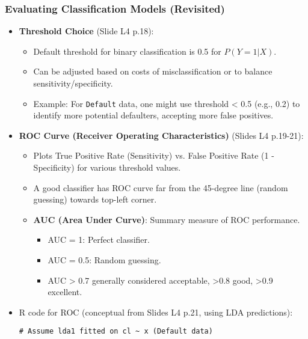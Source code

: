 \documentclass[12pt,a4paper]{article}
\newcommand{\Robject}[1]{\texttt{#1}} %
\begin{document}
\begin{itemize}
    \subsubsection{Evaluating Classification Models (Revisited)}
        \begin{itemize}
            \item \textbf{Threshold Choice} (Slide L4 p.18):
                \begin{itemize}
                    \item Default threshold for binary classification is 0.5 for $P(Y=1|X)$.
                    \item Can be adjusted based on costs of misclassification or to balance sensitivity/specificity.
                    \item Example: For \Robject{Default} data, one might use threshold < 0.5 (e.g., 0.2) to identify more potential defaulters, accepting more false positives.
                \end{itemize}
            \item \textbf{ROC Curve (Receiver Operating Characteristics)} (Slides L4 p.19-21):
                \begin{itemize}
                    \item Plots True Positive Rate (Sensitivity) vs. False Positive Rate (1 - Specificity) for various threshold values.
                    \item A good classifier has ROC curve far from the 45-degree line (random guessing) towards top-left corner.
                    \item \textbf{AUC (Area Under Curve)}: Summary measure of ROC performance.
                        \begin{itemize}
                            \item AUC = 1: Perfect classifier.
                            \item AUC = 0.5: Random guessing.
                            \item AUC > 0.7 generally considered acceptable, >0.8 good, >0.9 excellent.
                        \end{itemize}
                \end{itemize}
            \item R code for ROC (conceptual from Slides L4 p.21, using LDA predictions):
\begin{lstlisting}[caption={Generating ROC Curve Data (Conceptual, Slides L4 p.21)}]
# Assume lda1 fitted on cl ~ x (Default data)

\end{lstlisting}
\end{itemize}
\end{itemize}
\end{document}
